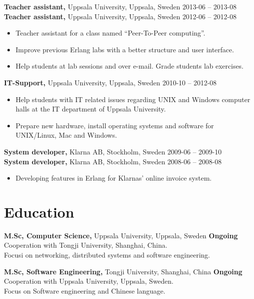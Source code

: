 \documentclass[margin]{res}
\begin{document}
\begin{resume}
{\bf Teacher assistant,} Uppsala University, Uppsala, Sweden \hfill 2013-06 -- 2013-08\\
{\bf Teacher assistant,} Uppsala University, Uppsala, Sweden \hfill 2012-06 -- 2012-08
 \begin{itemize} \itemsep -2pt  %
 \item Teacher assistant for a class named ``Peer-To-Peer computing''.
 \item Improve previous Erlang labs with a better structure and user interface.
 \item Help students at lab sessions and over e-mail. Grade students lab exercises.
 \end{itemize}

{\bf IT-Support,} Uppsala University, Uppsala, Sweden \hfill 2010-10 -- 2012-08
 \begin{itemize} \itemsep -2pt  %
 \item Help students with IT related issues regarding UNIX and Windows
   computer halls at the IT department of Uppsala University.
 \item Prepare new hardware, install operating systems and software for UNIX/Linux, Mac and Windows.
 \end{itemize}

{\bf System developer,} Klarna AB, Stockholm, Sweden \hfill 2009-06 -- 2009-10\\
{\bf System developer,} Klarna AB, Stockholm, Sweden \hfill 2008-06 -- 2008-08
 \begin{itemize} \itemsep -2pt  %
 \item Developing features in Erlang for Klarnas' online invoice system.
 \end{itemize}

\section{Education}
{\bf M.Sc,  Computer Science,} Uppsala University, Uppsala, Sweden \hfill \textbf{Ongoing} \\
Cooperation with Tongji University, Shanghai, China. \\
Focusi on networking, distributed systems and software engineering.

{\bf M.Sc, Software Engineering,} Tongji University, Shanghai, China \hfill \textbf{Ongoing} \\
Cooperation with Uppsala University, Uppsala, Sweden.\\
Focus on Software engineering and Chinese language.


\end{resume}
\end{document}
